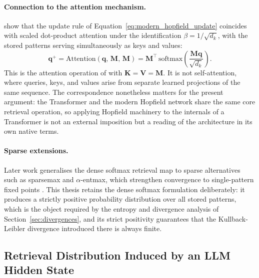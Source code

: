 \paragraph{Connection to the attention mechanism.}
\citet{ramsauer2020hopfield} show that the update rule of
Equation~\eqref{eq:modern_hopfield_update} coincides with scaled dot-product
attention under the identification $\beta = 1/\sqrt{d_k}$, with the stored
patterns serving simultaneously as keys and values:
\begin{equation}
    \mathbf{q}^{+}
    =
    \mathrm{Attention}\!\left(\mathbf{q},\,\mathbf{M},\,\mathbf{M}\right)
    =
    \mathbf{M}^{\top}\,\mathrm{softmax}\!\!\left(
        \frac{\mathbf{M}\mathbf{q}}{\sqrt{d_k}}
    \right).
    \label{eq:mhn_attention_equiv}
\end{equation}
This is the attention operation of \citet{vaswani2017attention} with
$\mathbf{K} = \mathbf{V} = \mathbf{M}$. It is not self-attention, where queries, keys, and
values arise from separate learned projections of the same sequence. The
correspondence nonetheless matters for the present argument: the Transformer
and the modern Hopfield network share the same core retrieval operation, so
applying Hopfield machinery to the internals of a Transformer is not an
external imposition but a reading of the architecture in its own native terms.

\paragraph{Sparse extensions.}
Later work generalises the dense softmax retrieval map to sparse alternatives
such as sparsemax and $\alpha$-entmax, which strengthen convergence to
single-pattern fixed points \citep{martins2023sparse}. This thesis retains the
dense softmax formulation deliberately: it produces a strictly positive
probability distribution over all stored patterns, which is the object
required by the entropy and divergence analysis of
Section~\ref{sec:divergences}, and its strict positivity guarantees that the
Kullback-Leibler divergence introduced there is always finite.

\subsection{Retrieval Distribution Induced by an LLM Hidden State}
\label{subsec:retrieval_distribution_llm}

